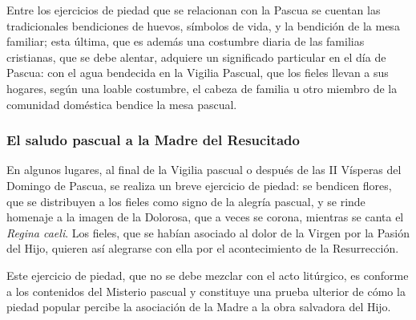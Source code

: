 \begin{introstyle}
Entre los ejercicios de piedad que se relacionan con la Pascua se cuentan las tradicionales bendiciones de huevos, símbolos de vida, y la bendición de la mesa familiar; esta última, que es además una costumbre diaria de las familias cristianas, que se debe alentar, adquiere un significado particular en el día de Pascua: con el agua bendecida en la Vigilia Pascual, que los fieles llevan a sus hogares, según una loable costumbre, el cabeza de familia u otro miembro de la comunidad doméstica bendice la mesa pascual.

\subsubsection{El saludo pascual a la Madre del Resucitado}

En algunos lugares, al final de la Vigilia pascual o después de las II Vísperas del Domingo de Pascua, se realiza un breve ejercicio de piedad: se bendicen flores, que se distribuyen a los fieles como signo de la alegría pascual, y se rinde homenaje a la imagen de la Dolorosa, que a veces se corona, mientras se canta el \textit{Regina caeli}. Los fieles, que se habían asociado al dolor de la Virgen por la Pasión del Hijo, quieren así alegrarse con ella por el acontecimiento de la Resurrección.

Este ejercicio de piedad, que no se debe mezclar con el acto litúrgico, es conforme a los contenidos del Misterio pascual y constituye una prueba ulterior de cómo la piedad popular percibe la asociación de la Madre a la obra salvadora del Hijo.
\end{introstyle}
